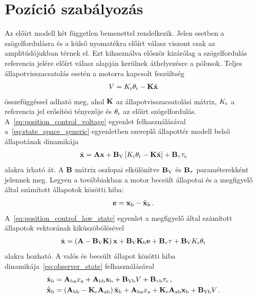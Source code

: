\section{Pozíció szabályozás}
Az előírt modell két független bemenettel rendelkezik. Jelen esetben a szögelfordulásra és a 
külső nyomatékra előírt válasz viszont csak az amplitúdójukban térnek el. Ezt kihasználva először kizárólag a szögelfordulás referencia jelére előírt válasz alapján 
kerülnek áthelyezésre a pólusok. Teljes állapotvisszacsatolás esetén a motorra kapcsolt feszültség
\begin{align}\label{eq:position_control_voltage}
    V = K_{\mathrm{r}} \theta_{\mathrm{r}} -\mathbf{K} \tilde{\mathbf{x}}
\end{align}
összefüggéssel adható meg, 
ahol $\mathbf{K}$ az állapotvisszacsatolási mátrix, 
$K_{\mathrm{r}}$ a referencia jel erősítési tényezője és
$\theta_{\mathrm{r}}$ az előírt szögelfordulás. A~\eqref{eq:position_control_voltage} egyenlet felhasználásával
a~\eqref{eq:state_space_generic} egyenletben szereplő állapottér modell belső állapotának dinamikája
\begin{align}\label{eq:position_control_law_state}
    \dot{\mathbf{x}} = \mathbf{A} \mathbf{x} + \mathbf{B}_{\mathrm{V}}\left[K_{\mathrm{r}} \theta_{\mathrm{r}} - \mathbf{K} \tilde{\mathbf{x}}\right] + \mathbf{B}_{\mathrm{\tau}} \tau_{\mathrm{e}}
\end{align}
alakra írható át. A $\mathbf{B}$ mátrix oszlopai elkülönítve $\mathbf{B}_{\mathrm{V}}$ és $\mathbf{B}_{\mathrm{\tau}}$ paraméterekként jelennek meg.
Legyen a továbbiakban a motor becsült állapotai és a megfigyelő által számított állapotok közötti hiba:
\begin{align}
    \mathbf{e} = \mathbf{x}_{\mathrm{b}} - \tilde{\mathbf{x}}_{\mathrm{b}}\,.
\end{align}
A~\eqref{eq:position_control_law_state} egyenlet a megfigyelő által számított állapotok 
vektorának kiküszöbölésével
\begin{align}
    \dot{\mathbf{x}} = \left(\mathbf{A} - \mathbf{B}_{\mathrm{V}} \mathbf{K}\right) \mathbf{x} + 
    \mathbf{B}_{\mathrm{V}} \mathbf{K}_{\mathrm{b}} \mathbf{e} + 
    \mathbf{B}_{\mathrm{\tau}} \tau + 
    \mathbf{B}_{\mathrm{V}} K_{\mathrm{r}} \theta_{\mathrm{r}}
\end{align}
alakra hozható. A valós és becsült állapot közötti hiba dinamikája~\eqref{eq:observer_state} felhasználásával
\begin{equation}
    \begin{split}
    \dot{\mathbf{x}}_{\mathrm{b}} &= \mathbf{A}_{\mathrm{ba}} x_{\mathrm{a}} + \mathbf{A}_{\mathrm{bb}} \mathbf{x}_{\mathrm{b}} + 
    \mathbf{B}_{\mathrm{Vb}} V + \mathbf{B}_{\mathrm{\tau b}} \tau_{\mathrm{e}}\,,\\
    \dot{\tilde{\mathbf{x}}}_{\mathrm{b}} &= \left(\mathbf{A}_{\mathrm{bb}} - \mathbf{K}_{\mathrm{e}} \mathbf{A}_{\mathrm{ab}}\right) \tilde{\mathbf{x}}_{\mathrm{b}} +
    \mathbf{A}_{\mathrm{ba}} x_{\mathrm{a}} +
    \mathbf{K}_{\mathrm{e}} \mathbf{A}_{\mathrm{ab}} \mathbf{x}_{\mathrm{b}} +
    \mathbf{B}_{\mathrm{Vb}} V\,.
    \end{split}
\end{equation}
